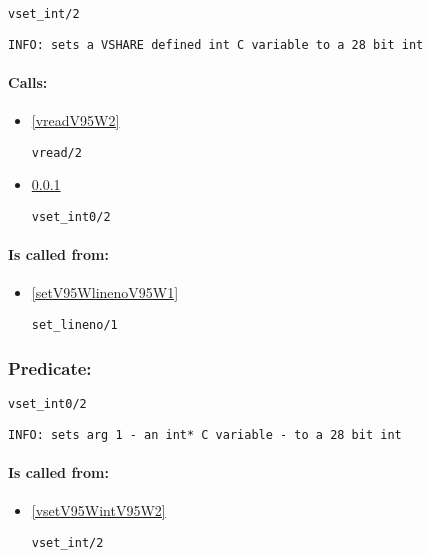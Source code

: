 \begin{verbatim}
vset_int/2
\end{verbatim}

{\small \begin{verbatim}
INFO: sets a VSHARE defined int C variable to a 28 bit int

\end{verbatim}}
\paragraph{Calls:} 
\begin{itemize}
\item \ref{vreadV95W2} 
\begin{verbatim}
vread/2
\end{verbatim}

\item \ref{vsetV95Wint0V95W2} 
\begin{verbatim}
vset_int0/2
\end{verbatim}

\end{itemize}
\paragraph{Is called from:} 
\begin{itemize}
\item \ref{setV95WlinenoV95W1} 
\begin{verbatim}
set_lineno/1
\end{verbatim}

\end{itemize}

\subsubsection{Predicate:} \label{vsetV95Wint0V95W2}

\begin{verbatim}
vset_int0/2
\end{verbatim}

{\small \begin{verbatim}
INFO: sets arg 1 - an int* C variable - to a 28 bit int

\end{verbatim}}
\paragraph{Is called from:} 
\begin{itemize}
\item \ref{vsetV95WintV95W2} 
\begin{verbatim}
vset_int/2
\end{verbatim}

\end{itemize}

